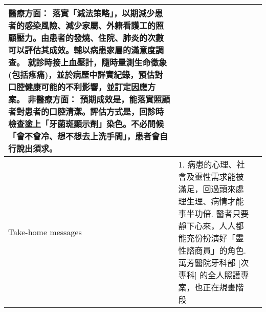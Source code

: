 \documentclass[12pt, a4paper]{article}
\begin{document}
\begin{xltabular}{1.0\linewidth}[c]{|p{2.3cm}|p{12.4cm}|l|}
  
   醫療方面： 落實「減法策略」，以期減少患者的感染風險、減少家屬、外籍看護工的照顧壓力。由患者的發燒、住院、肺炎的次數可以評估其成效。輔以病患家屬的滿意度調查。 就診時接上血壓計，隨時量測生命徵象(包括疼痛)，並於病歷中詳實紀錄，預估對口腔健康可能的不利影響，並訂定因應方案。\newline 
   非醫療方面： 預期成效是，能落實照顧者對患者的口腔清潔。評估方式是，回診時檢查塗上「牙菌斑顯示劑」染色。不必問候「會不會冷、想不想去上洗手間」，患者會自行說出須求。 &
   \\ \hline
Take-home messages &
    1. 病患的心理、社會及靈性需求能被滿足，回過頭來處理生理、病情才能事半功倍. 醫者只要靜下心來，人人都能充份扮演好「靈性諮商員」的角色. 萬芳醫院牙科部 [次專科]  的全人照護專案，也正在規畫階段 \newline
    &
   \\ \hline
\end{xltabular}

\end{document}
